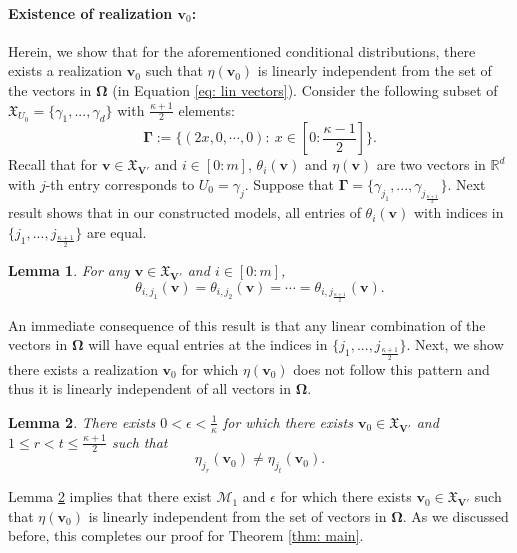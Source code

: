 \documentclass[accepted]{uai2022}
\newtheorem{lemma}{Lemma}
\newcommand{\V}[0]{\mathbf{V}}
\newcommand{\M}[0]{\mathcal{M}}
\newcommand{\dom}[1]{\mathfrak{X}_{#1}}
\begin{document}
    \paragraph{Existence of realization $\textbf{v}_0$:} \label{sec: complete}
    Herein, we show that for the aforementioned conditional distributions, there exists a realization $\textbf{v}_0$ such that $\eta(\mathbf{v}_0)$ is linearly independent from the set of the vectors in $\mathbf{\Omega}$ (in Equation \eqref{eq: lin vectors}).  
    Consider the following subset of $\dom{U_0}=\{\gamma_1,...,\gamma_d\}$ with $\frac{\kappa+1}{2}$ elements:
    \begin{equation*}%
        \mathbf{\Gamma} := \Big\{(2x,0,\cdots,0)\!:\: x\in [0:\frac{\kappa-1}{2}]\Big\}.
    \end{equation*}
    Recall that for $\mathbf{v}\in \dom{\V'}$ and $i\in[0:m]$, $\theta_i(\mathbf{v})$ and $\eta(\mathbf{v})$ are two vectors in $\mathbb{R}^d$ with $j$-th entry corresponds to $U_0=\gamma_j$. 
    Suppose that $\mathbf{\Gamma}=\{\gamma_{j_1},...,\gamma_{j_{\frac{\kappa+1}{2}}}\}$. Next result shows that in our constructed models, all entries of $\theta_i(\textbf{v})$ with indices in $\{j_1,...,j_{\frac{\kappa+1}{2}}\}$ are equal.
    \begin{lemma} \label{lem: theta index}
        For any $\mathbf{v} \in \dom{\V'}$ and $i\in[0:m]$,
        \begin{equation*}
            \theta_{i,j_1}(\mathbf{v}) = \theta_{i,j_2}(\mathbf{v}) = \cdots= \theta_{i,j_{\frac{\kappa+1}{2}}}(\mathbf{v}).
        \end{equation*}
    \end{lemma}
    An immediate consequence of this result is that any linear combination of the vectors in $\mathbf{\Omega}$ will have equal entries at the indices in $\{j_1,...,j_{\frac{\kappa+1}{2}}\}$.
    Next, we show there exists a realization $\textbf{v}_0$ for which $\eta(\mathbf{v}_0)$ does not follow this pattern and thus it is linearly independent of all vectors in $\mathbf{\Omega}$.
    \begin{lemma}\label{lem: eta index}
        There exists $0<\epsilon<\frac{1}{\kappa}$ for which there exists $\mathbf{v}_0 \in \dom{\V'}$ and $1\leq r <t\leq \frac{\kappa+1}{2}$ such that 
        \begin{equation*}
            \eta_{j_r}(\mathbf{v}_0) \neq \eta_{j_t}(\mathbf{v}_0). 
        \end{equation*}
    \end{lemma}
    Lemma \ref{lem: eta index} implies that there exist $\M_1$ and $\epsilon$ for which there exists $\mathbf{v}_0 \in \dom{\V'}$ such that $\eta(\mathbf{v}_0)$ is linearly independent from the set of vectors in $\mathbf{\Omega}$.
    As we discussed before, this completes our proof for Theorem \ref{thm: main}.
\end{document}
